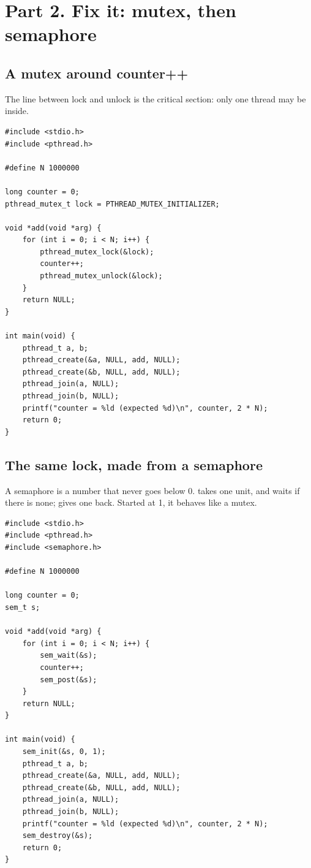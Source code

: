 \documentclass[11pt,a4paper]{article}
\begin{document}
\section{Part 2. Fix it: mutex, then semaphore}

\subsection{A mutex around counter++}

The line between lock and unlock is the critical section: only one thread may be inside.

\begin{lstlisting}[style=ccode,caption={mutex.c}]
#include <stdio.h>
#include <pthread.h>

#define N 1000000

long counter = 0;
pthread_mutex_t lock = PTHREAD_MUTEX_INITIALIZER;

void *add(void *arg) {
    for (int i = 0; i < N; i++) {
        pthread_mutex_lock(&lock);
        counter++;
        pthread_mutex_unlock(&lock);
    }
    return NULL;
}

int main(void) {
    pthread_t a, b;
    pthread_create(&a, NULL, add, NULL);
    pthread_create(&b, NULL, add, NULL);
    pthread_join(a, NULL);
    pthread_join(b, NULL);
    printf("counter = %ld (expected %d)\n", counter, 2 * N);
    return 0;
}
\end{lstlisting}

\subsection{The same lock, made from a semaphore}

A semaphore is a number that never goes below 0.  takes one unit, and waits if
there is none;  gives one back. Started at 1, it behaves like a mutex.

\begin{lstlisting}[style=ccode,caption={sem.c}]
#include <stdio.h>
#include <pthread.h>
#include <semaphore.h>

#define N 1000000

long counter = 0;
sem_t s;

void *add(void *arg) {
    for (int i = 0; i < N; i++) {
        sem_wait(&s);
        counter++;
        sem_post(&s);
    }
    return NULL;
}

int main(void) {
    sem_init(&s, 0, 1);
    pthread_t a, b;
    pthread_create(&a, NULL, add, NULL);
    pthread_create(&b, NULL, add, NULL);
    pthread_join(a, NULL);
    pthread_join(b, NULL);
    printf("counter = %ld (expected %d)\n", counter, 2 * N);
    sem_destroy(&s);
    return 0;
}
\end{lstlisting}
\end{document}

